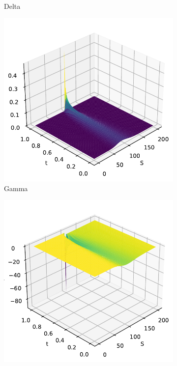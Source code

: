 \begin{figure}[H]
\begin{subfigure}[b]{0.3\linewidth}
        \caption{Delta}
    \end{subfigure}
    \begin{subfigure}[b]{0.3\linewidth}
        \includegraphics[width=\linewidth]{Imagenes/Parte1/6_Sols/Call/Call_Gamma.pdf}
        \caption{Gamma}
    \end{subfigure}
    \begin{subfigure}[b]{0.3\linewidth}
        \includegraphics[width=\linewidth]{Imagenes/Parte1/6_Sols/Call/Call_Theta.pdf}

\end{subfigure}
\end{figure}

